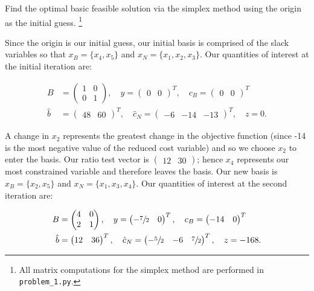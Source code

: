 Find the optimal basic feasible solution via the simplex method using the origin as the initial guess. \footnote{
  All matrix computations for the simplex method are performed in \texttt{problem\_1.py}.
}

\begin{solution}
  Since the origin is our initial guess, our initial basis is comprised of the slack variables so that 
  $x_B = \{ x_4, x_5 \}$ and $x_N = \{ x_1, x_2, x_3 \}$. Our quantities of interest at the initial iteration are:


  \begin{align*}
    B &= \begin{pmatrix}
      1 & 0 \\
      0 & 1
    \end{pmatrix}, \quad y = \begin{pmatrix}
      0 & 0
    \end{pmatrix}^T, \quad c_B = \begin{pmatrix}
      0 & 0
    \end{pmatrix}^T \\
    \hat{b} &= \begin{pmatrix}
      48 & 60
    \end{pmatrix}^T, \quad \hat{c}_N = \begin{pmatrix}
      -6 & -14 & -13
    \end{pmatrix}^T, \quad z = 0.
  \end{align*}

  A change in $x_2$ represents the greatest change in the objective function (since -14 is the most negative value of
  the reduced cost variable) and so we choose $x_2$ to enter the basis. Our ratio test vector is 
  $\begin{pmatrix} 12 & 30 \end{pmatrix}$; hence $x_4$ represents our most constrained variable and therefore leaves 
  the basis. Our new basis is $x_B = \{ x_2, x_5 \}$ and $x_N = \{ x_1, x_3, x_4 \}$. Our quantities of interest at the
  second iteration are:

  \begin{align*}
    B &= \begin{pmatrix}
      4 & 0 \\
      2 & 1
    \end{pmatrix}, \quad y = \begin{pmatrix}
      -\sfrac{7}{2} & 0
    \end{pmatrix}^T, \quad c_B = \begin{pmatrix}
      -14 & 0
    \end{pmatrix}^T \\
    \hat{b} &= \begin{pmatrix}
      12 & 36
    \end{pmatrix}^T, \quad \hat{c}_N = \begin{pmatrix}
      -\sfrac{5}{2} & -6 & \sfrac{7}{2}
    \end{pmatrix}^T, \quad z = -168.
  \end{align*}


\end{solution}
